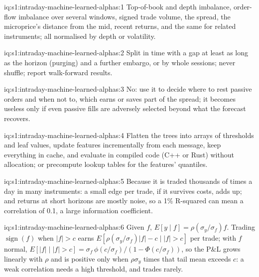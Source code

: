 \begin{solution}{iq:s1:intraday-machine-learned-alphas:1}
Top-of-book and depth imbalance, order-flow imbalance over several windows, signed trade volume, the spread, the microprice's distance from the mid, recent
returns, and the same for related instruments; all normalised by depth or volatility.
\end{solution}

\begin{solution}{iq:s1:intraday-machine-learned-alphas:2}
Split in time with a gap at least as long as the horizon (purging) and a further embargo, or by whole sessions; never shuffle; report walk-forward results.
\end{solution}

\begin{solution}{iq:s1:intraday-machine-learned-alphas:3}
No: use it to decide where to rest passive orders and when not to, which earns or saves part of the spread; it becomes useless only if even passive fills
are adversely selected beyond what the forecast recovers.
\end{solution}

\begin{solution}{iq:s1:intraday-machine-learned-alphas:4}
Flatten the trees into arrays of thresholds and leaf values, update features incrementally from each message, keep everything in cache, and evaluate in
compiled code (C++ or Rust) without allocation; or precompute lookup tables for the features' quantiles.
\end{solution}

\begin{solution}{iq:s1:intraday-machine-learned-alphas:5}
Because it is traded thousands of times a day in many instruments: a small edge per trade, if it survives costs, adds up; and returns at short horizons are
mostly noise, so a 1\% R-squared can mean a correlation of 0.1, a large information coefficient.
\end{solution}

\begin{solution}{iq:s1:intraday-machine-learned-alphas:6}
Given $f$, $E[y \mid f] = \rho(\sigma_y/\sigma_f)f$. Trading $\operatorname{sign}(f)$ when $|f| > c$ earns $E[\rho(\sigma_y/\sigma_f)|f| - c \mid |f| > c]$ per
trade; with $f$ normal, $E[|f| \mid |f| > c] = \sigma_f\,\phi(c/\sigma_f)/(1 - \Phi(c/\sigma_f))$, so the P\&L grows linearly with
$\rho$ and is positive only when $\rho\sigma_y$ times that tail mean exceeds $c$: a weak correlation needs a high threshold, and trades rarely.
\end{solution}
